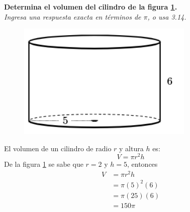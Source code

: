 \question[10] \textbf{Determina el volumen del cilindro de la figura \ref{fig:vol_cil_10}.}\\
\textit{Ingresa una respuesta exacta en términos de $\pi$, o usa 3.14.}

\begin{minipage}{0.3\linewidth}
    \begin{figure}[H]
        \begin{center}
            \includegraphics[width=0.75\textwidth]{../images/vol_cil_10.png}
        \end{center}
        \caption{}
        \label{fig:vol_cil_10}
    \end{figure}
\end{minipage}
\begin{minipage}{0.7\linewidth}
    \begin{solutionbox}{5cm}        El volumen de un cilindro de radio $r$ y altura $h$ es:
        \begin{equation*}
            V = \pi r^2 h
        \end{equation*}
        De la figura \ref{fig:vol_cil_10} se sabe que $r=2$ y $h=5$, entonces
        \begin{equation*}
            \begin{split}
                V & = \pi r^2 h\\
                & = \pi (5)^2 (6)\\
                & = \pi (25) (6)\\
                & = 150\pi
            \end{split}
        \end{equation*}
    \end{solutionbox}
\end{minipage}